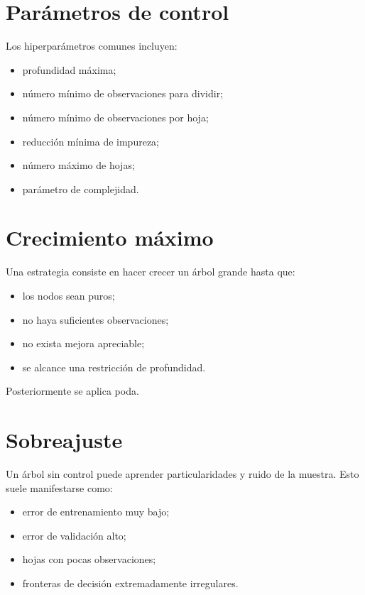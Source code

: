 \documentclass[
  spanish,
  11pt,
  letterpaper,
  DIV=11,
  numbers=noendperiod]{scrreprt}
\providecommand{\tightlist}{%
  \setlength{\itemsep}{0pt}\setlength{\parskip}{0pt}}
\theoremstyle{definition}
\theoremstyle{plain}
\theoremstyle{definition}
\theoremstyle{remark}
\begin{document}
\section{Parámetros de control}\label{paruxe1metros-de-control}

Los hiperparámetros comunes incluyen:

\begin{itemize}
\tightlist
\item
  profundidad máxima;
\item
  número mínimo de observaciones para dividir;
\item
  número mínimo de observaciones por hoja;
\item
  reducción mínima de impureza;
\item
  número máximo de hojas;
\item
  parámetro de complejidad.
\end{itemize}

\section{Crecimiento máximo}\label{crecimiento-muxe1ximo}

Una estrategia consiste en hacer crecer un árbol grande hasta que:

\begin{itemize}
\tightlist
\item
  los nodos sean puros;
\item
  no haya suficientes observaciones;
\item
  no exista mejora apreciable;
\item
  se alcance una restricción de profundidad.
\end{itemize}

Posteriormente se aplica poda.

\section{Sobreajuste}\label{sobreajuste-1}

Un árbol sin control puede aprender particularidades y ruido de la
muestra. Esto suele manifestarse como:

\begin{itemize}
\tightlist
\item
  error de entrenamiento muy bajo;
\item
  error de validación alto;
\item
  hojas con pocas observaciones;
\item
  fronteras de decisión extremadamente irregulares.
\end{itemize}
\end{document}
